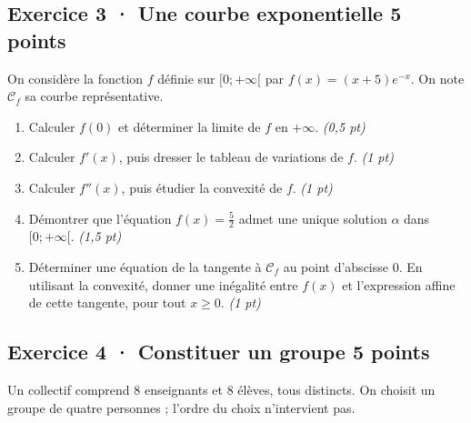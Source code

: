\clearpage{}\par

\subsection*{Exercice 3 · Une courbe exponentielle \hfill 5 points}On considère la fonction $f$ définie sur $[0;+\infty[$ par $f(x)=(x+5)e^{-x}$. On note $\mathcal C_f$ sa courbe représentative.

\begin{enumerate}

\item Calculer $f(0)$ et déterminer la limite de $f$ en $+\infty$. \hfill\textit{(0,5 pt)}

\item Calculer $f' (x)$, puis dresser le tableau de variations de $f$. \hfill\textit{(1 pt)}

\item Calculer $f'' (x)$, puis étudier la convexité de $f$. \hfill\textit{(1 pt)}

\item Démontrer que l'équation $f(x)=\frac{5}{2}$ admet une unique solution $\alpha$ dans $[0;+\infty[$. \hfill\textit{(1,5 pt)}

\item Déterminer une équation de la tangente à $\mathcal C_f$ au point d'abscisse $0$. En utilisant la convexité, donner une inégalité entre $f(x)$ et l'expression affine de cette tangente, pour tout $x\ge0$. \hfill\textit{(1 pt)}

\end{enumerate}

\subsection*{Exercice 4 · Constituer un groupe \hfill 5 points}Un collectif comprend $8$ enseignants et $8$ élèves, tous distincts. On choisit un groupe de quatre personnes ; l'ordre du choix n'intervient pas.

